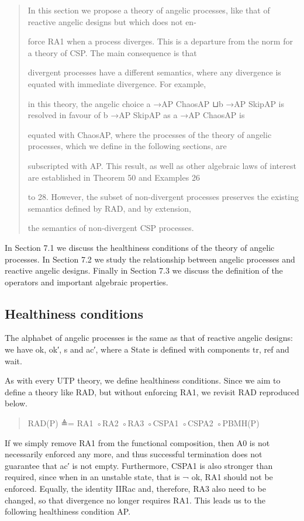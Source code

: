 \documentclass[11pt]{article}
\begin{document}
\begin{quote}\small\raggedright
In this section we propose a theory of angelic processes, like that of reactive angelic designs but which does not en-
\par
force RA1 when a process diverges. This is a departure from the norm for a theory of CSP. The main consequence is that
\par
divergent processes have a different semantics, where any divergence is equated with immediate divergence. For example,
\par
in this theory, the angelic choice a →AP ChaosAP ⊔b →AP SkipAP is resolved in favour of b →AP SkipAP as a →AP ChaosAP is
\par
equated with ChaosAP, where the processes of the theory of angelic processes, which we define in the following sections, are
\par
subscripted with AP. This result, as well as other algebraic laws of interest are established in Theorem 50 and Examples 26
\par
to 28. However, the subset of non-divergent processes preserves the existing semantics defined by RAD, and by extension,
\par
the semantics of non-divergent CSP processes.
\end{quote}

In Section 7.1 we discuss the healthiness conditions of the theory of angelic processes. In Section 7.2 we study the relationship between angelic processes and reactive angelic designs. Finally in Section 7.3 we discuss the definition of the operators and important algebraic properties.

\subsection{Healthiness conditions}
The alphabet of angelic processes is the same as that of reactive angelic designs: we have ok, ok′, s and ac′, where a State is defined with components tr, ref and wait.

As with every UTP theory, we define healthiness conditions. Since we aim to define a theory like RAD, but without enforcing RA1, we revisit RAD reproduced below.

\begin{quote}\small\raggedright
RAD(P) ≜= RA1 ◦RA2 ◦RA3 ◦CSPA1 ◦CSPA2 ◦PBMH(P)
\end{quote}

If we simply remove RA1 from the functional composition, then A0 is not necessarily enforced any more, and thus successful termination does not guarantee that ac′ is not empty. Furthermore, CSPA1 is also stronger than required, since when in an unstable state, that is ¬ ok, RA1 should not be enforced. Equally, the identity IIRac and, therefore, RA3 also need to be changed, so that divergence no longer requires RA1. This leads us to the following healthiness condition AP.
\end{document}
